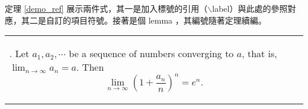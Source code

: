 定理 \ref{demo_ref} 展示兩件式，其一是加入標號的引用（$\backslash$label）與此處的參照對應，其二是自訂的項目符號。接著是個 {\E lemma} ，其編號隨著定理續編。
\begin{center}\colorbox{slight}{\begin{tabular}{p{}}
\begin{lemma}. {\C Let $a_1,a_2,\cdots$ be a sequence of numbers converging to $a$, that is, $\lim_{n\rightarrow \infty} a_n=a$. Then}
$$\lim_{n\rightarrow \infty} (1+\frac{a_n}{n})^n=e^n.$$
\end{lemma}
 \end{tabular}}\end{center}



%

